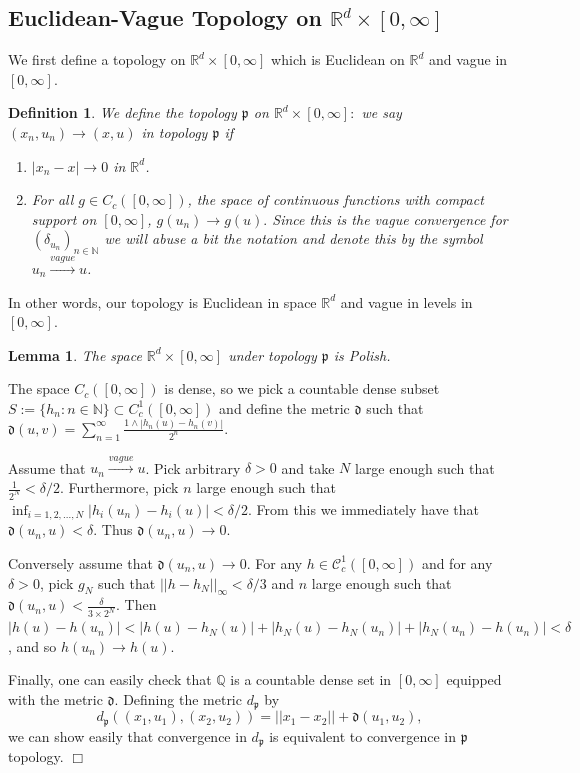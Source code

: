 \documentclass[12pt]{article}
\newenvironment {proof}{{\noindent\bf Proof }}{\hfill $\Box$ \medskip}
\newtheorem{lemma}[theorem]{Lemma}
\newtheorem{definition}[theorem]{Definition}
\newcommand{\IR}{\mathbb R}
\begin{document}
\subsection{Euclidean-Vague Topology on $\IR^d \times [0,\infty]$}\label{sec: Convergence in Product Topology}
We first define a topology on $\IR^d \times [0,\infty]$ which is Euclidean on $\IR^d$ and vague in $[0,\infty]$.
\begin{definition}
We define the topology $\mathfrak{p}$ on $\IR^d \times [0,\infty]:$
we say $(x_n,u_n) \to (x,u)$ in topology $\mathfrak{p}$ if 
\begin{enumerate}
    \item $|x_n-x| \to 0$ in $\IR^d$.
    \item  For all $g \in C_{c}([0,\infty])$, the space of continuous functions with compact support on $[0,\infty]$, $g(u_n) \to g(u).$ Since this is the vague convergence for $(\delta_{u_n})_{n \in \mathbb{N}}$ we will abuse a bit the notation and denote this by the symbol $u_n \xrightarrow{vague} u$. 
\end{enumerate}
\end{definition}

In other words, our topology is Euclidean in space $\IR^d$ and vague in levels in $[0,\infty]$.
\begin{lemma}\label{Vague times Euclidean is Polish}
The space $\IR^d \times [0,\infty]$ under topology $\mathfrak{p}$ is Polish.
\end{lemma}
\begin{proof}
The space $C_c([0,\infty])$ is dense, so we pick a countable dense subset $S:=\{h_n: n \in \mathbb{N}\} \subset C^{1}_c([0,\infty])$ and define the metric $\mathfrak{d}$ such that $\mathfrak{d}(u,v)=\sum_{n=1}^{\infty}\frac{1 \wedge |h_n(u)-h_n(v)|}{2^n}$.

Assume that $u_n \xrightarrow{vague} u$. Pick arbitrary $\delta>0$ and take $N$ large enough such that $\frac{1}{2^N}<\delta/2$. Furthermore, pick $n$ large enough such that $\inf_{i=1,2,...,N}|h_i(u_n)-h_i(u)|<\delta/2$. From this we immediately have that $\mathfrak{d}(u_n,u)<\delta$. Thus $\mathfrak{d}(u_n,u) \to 0$.

Conversely assume that $\mathfrak{d}(u_n,u) \to 0$. For any $h \in \mathcal{C}^{1}_c([0,\infty])$ and for any $\delta>0$, pick $g_N$ such that $||h-h_N||_{\infty}<\delta /3$ and $n$ large enough such that $\mathfrak{d}(u_n,u)< \frac{\delta}{3 \times 2^N}$. Then $|h(u)-h(u_n)|< |h(u)-h_N(u)|+|h_N(u)-h_N(u_n)|+|h_N(u_n)-h(u_n)|<\delta$, and so $h(u_n) \to h(u)$.

Finally, one can easily check that $\mathbb{Q}$ is a countable dense set in $[0,\infty]$ equipped with the metric $\mathfrak{d}$.
Defining the metric $d_{\mathfrak{p}}$
by
$$d_{\mathfrak{p}}((x_1,u_1),(x_2,u_2))=||x_1-x_2||+\mathfrak{d}(u_1,u_2),$$
we can show easily that
convergence in $d_{\mathfrak{p}}$
is equivalent to convergence in 
$\mathfrak{p}$ topology.
\end{proof}
\end{document}
